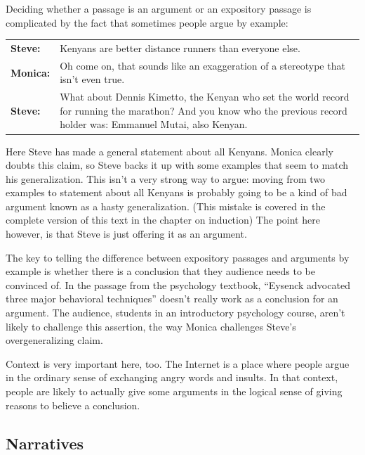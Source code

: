Deciding whether a passage is an argument or an expository passage is complicated by the fact that sometimes people argue by example: 

\begin{adjustwidth}{2em}{0em}
\begin{longtabu}{p{.1\linewidth}p{.8\linewidth}}
\textbf{Steve:} & Kenyans are better distance runners than everyone else. \\
\textbf{Monica:} & Oh come on, that sounds like an exaggeration of a stereotype that isn't even true.\\
\textbf{Steve:} & What about Dennis Kimetto, the Kenyan who set the world record for running the marathon? And you know who the previous record holder was: Emmanuel Mutai, also Kenyan. \\
\end{longtabu}
\end{adjustwidth}
\vspace{-1cm}

Here Steve has made a general statement about all Kenyans. Monica clearly doubts this claim, so Steve backs it up with some examples that seem to match his generalization. This isn't a very strong way to argue: moving from two examples to statement about all Kenyans is probably going to be a kind of bad argument known as a hasty generalization. (This mistake is covered in the complete version of this text in the chapter on induction\label{ver_var}) The point here however, is that Steve is just offering it as an argument. 

The key to telling the difference between expository passages and arguments by example is whether there is a conclusion that they audience needs to be convinced of. In the passage from the psychology textbook, ``Eysenck advocated three major behavioral techniques'' doesn't really work as a conclusion for an argument. The audience, students in an introductory psychology course, aren't likely to challenge this assertion, the way Monica  challenges Steve's overgeneralizing claim. 

Context is very important here, too. The Internet is a place where people argue in the ordinary sense of exchanging angry words and insults. In that context, people are likely to actually give some arguments in the logical sense of giving reasons to believe a conclusion. 

\subsection{Narratives} 

